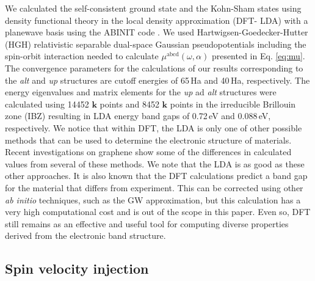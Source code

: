 \documentclass[prb,11pt,tightenlines,twocolumn,aps]{revtex4-1}
\begin{document}
{\color{red} We calculated the self-consistent ground state and the Kohn-Sham
states using density functional theory in the local density approximation (DFT-
LDA) with a planewave basis using the ABINIT code \cite{gonzeCPC09}.}
% 
We used Hartwigsen-Goedecker-Hutter (HGH) relativistic separable dual-space
Gaussian pseudopotentials \cite{hartwigsenPRB98} including the spin-orbit
interaction needed to calculate $\mu^{\mathrm{abcd}}(\omega,\alpha)$ presented
in Eq.
\eqref{eq:mu}.
% 
The convergence parameters for the calculations of our results corresponding to
the \emph{alt} and \emph{up} structures are cutoff energies of 65\,Ha and
40\,Ha, respectively. The energy eigenvalues and matrix elements for the
\emph{up} ad \emph{alt} structures were calculated using 14452 $\mathbf{k}$
points and 8452 $\mathbf{k}$ points in the irreducible Brillouin zone (IBZ)
{\color{red} resulting in LDA energy band gaps of 0.72\,eV and 0.088\,eV,
respectively.
% 
We notice that within DFT, the LDA is only one of other possible methods that
can be used to determine the electronic structure of materials. Recent
investigations on graphene show some of the differences in calculated values
from several of these methods\cite{karamanisJPCC15,botelloACR14}. We note that
the LDA is as good as these other approaches. It is also known that the DFT
calculations predict a band gap for the material that differs from experiment.
This can be corrected using other \emph{ab initio} techniques, such as the GW
approximation\cite{onidaRMP02}, but this calculation has a very high
computational cost and is out of the scope in this paper. Even so, DFT still
remains as an effective and useful tool for computing diverse properties
derived from the electronic band structure.}


\subsection{Spin velocity injection} %
\label{sec:res-spin_velocity}
\end{document}
